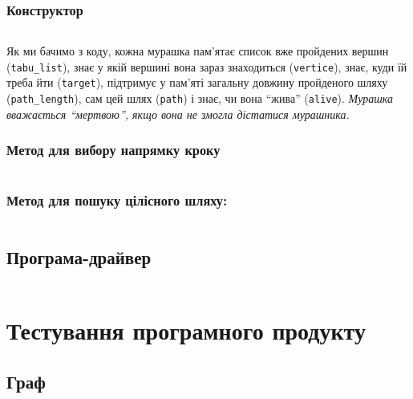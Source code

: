 \documentclass[a4paper, 12pt]{article}
\numberwithin{equation}{section}
\begin{document}
\subsubsection{Конструктор}

\inputminted[firstline=6, lastline=13]{python}{../../code/salesman/main.py}

Як ми бачимо з коду, кожна мурашка пам'ятає список вже пройдених вершин (\verb|tabu_list|), знає у якій вершині вона зараз знаходиться (\verb|vertice|), знає, куди їй треба йти (\verb|target|), підтримує у пам'яті загальну довжину пройденого шляху (\verb|path_length|), сам цей шлях (\verb|path|) і знає, чи вона ``жива'' (\verb|alive|). \textit{Мурашка вважається ``мертвою'', якщо вона не змогла дістатися мурашника.}

\subsubsection{Метод для вибору напрямку кроку}

\inputminted[firstline=15, lastline=44]{python}{../../code/salesman/main.py}

\subsubsection{Метод для пошуку цілісного шляху:}

\inputminted[firstline=46, lastline=52]{python}{../../code/salesman/main.py}

\subsection{Програма-драйвер}

\inputminted[firstline=82, lastline=91]{python}{../../code/salesman/main.py}

\section{Тестування програмного продукту}

\subsection{Граф}
\end{document}
